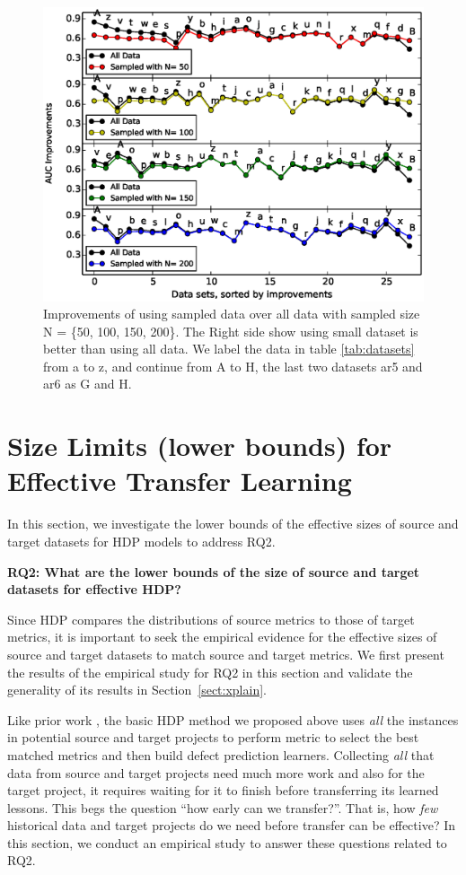 
\begin{figure}[t]
	\centering
	\includegraphics[width=.66\linewidth]{Figures/raleigh/sample_random.eps}
	\caption{Improvements of using sampled data over all data with sampled size N = \{50, 100, 150, 200\}. The Right side show  using small dataset is better than using all data. We label the data in table \ref{tab:datasets} from a to z, and continue from A to H, the last two datasets ar5 and ar6 as G and H.}
	\label{fig:small_data}
\end{figure}

\section{Size Limits (lower bounds) for Effective Transfer Learning}
\label{sec:sizelimit}

In this section, we investigate the lower bounds of the effective sizes of source and target datasets for HDP models to address RQ2.

{\bf RQ2: What are the  lower  bounds  of  the  size  of source and target  datasets  for  effective HDP?}

Since HDP compares the distributions of source metrics to those of target metrics, it is important to seek the empirical evidence for the effective sizes of source and target datasets to match source and target metrics. We first present the results of the empirical study for RQ2 in this section and validate the generality of its results in Section~\ref{sect:xplain}.

Like prior work \cite{Nam13,
  Ma12, Rahman12, Ryu14,
  Zhang14}, the basic HDP method we
proposed above uses {\em all} the instances in potential source and target projects to perform metric to select the best matched metrics and then build
defect prediction learners.
Collecting {\em all} that data from source and target projects need much more work and also
for the target project, it requires waiting for it to finish before
transferring its learned lessons. This begs the question ``how early can we transfer?''.
That is, how {\em few} historical data and target projects do we need before transfer can be effective? In this section, we conduct an empirical study to answer these questions related to RQ2.

